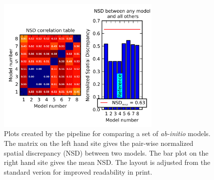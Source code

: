 \documentclass[preprint,pdf]{iucr}              %
\begin{document}
\begin{figure}
\centering
\includegraphics[width=8cm]{nsd.png}%
\caption{Plots created by the pipeline for comparing a set of \textit{ab-initio} models. The matrix on the left hand site gives the pair-wise normalized spatial discrepancy (NSD) between two models. The bar plot on the right hand site gives the mean NSD. The layout is adjusted from the standard verion for improved readability in print.}
\label{fgr:nsd}
\end{figure}
\end{document}
